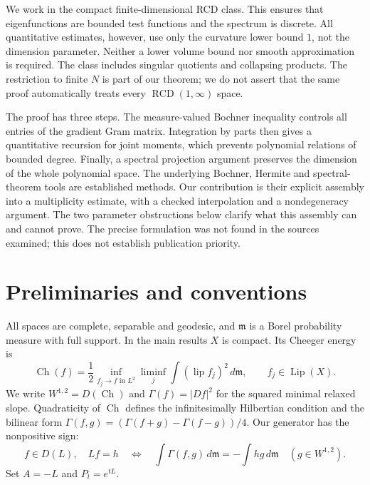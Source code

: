 \documentclass[12pt]{amsart}
\theoremstyle{definition}
\theoremstyle{remark}
\numberwithin{equation}{section}
\DeclareMathOperator{\Ch}{Ch}
\DeclareMathOperator{\Lip}{Lip}
\newcommand{\dm}{\,d\mathfrak m}
\theoremstyle{plain}
\begin{document}
We work in the compact finite-dimensional RCD class. This ensures
that eigenfunctions are bounded test functions and the spectrum is discrete.
All quantitative estimates, however, use only the curvature lower bound
$1$, not the dimension parameter. Neither a lower volume bound nor smooth
approximation is required. The class includes singular quotients and
collapsing products. The restriction to finite $N$ is part of our theorem;
we do not assert that the same proof automatically treats every
$\operatorname{RCD}(1,\infty)$ space.

The proof has three steps. The measure-valued Bochner inequality controls
all entries of the gradient Gram matrix. Integration by parts then gives
a quantitative recursion for joint moments, which prevents polynomial
relations of bounded degree. Finally, a spectral projection argument
preserves the dimension of the whole polynomial space. The underlying
Bochner, Hermite and spectral-theorem tools are established methods.
Our contribution is their explicit assembly into a multiplicity estimate,
with a checked interpolation and a nondegeneracy argument.
The two parameter obstructions below clarify what this assembly can and
cannot prove. The precise formulation was not found in the sources
examined; this does not establish publication priority.

\section{Preliminaries and conventions}
All spaces are complete, separable and geodesic, and $\mathfrak m$ is a
Borel probability measure with full support. In the main results $X$ is
compact. Its Cheeger energy is
\[
 \Ch(f)=\frac12\inf_{f_j\to f\text{ in }L^2}
 \liminf_j\int (\operatorname{lip} f_j)^2\dm,
 \qquad f_j\in\Lip(X).
\]
We write $W^{1,2}=D(\Ch)$ and $\Gamma(f)=|Df|^2$ for the squared minimal
relaxed slope. Quadraticity of $\Ch$ defines the infinitesimally Hilbertian
condition and the bilinear form
$\Gamma(f,g)=(\Gamma(f+g)-\Gamma(f-g))/4$.
Our generator has the nonpositive sign:
\begin{equation}\label{en:generator}
 f\in D(L),\quad Lf=h
 \quad\Longleftrightarrow\quad
 \int\Gamma(f,g)\dm=-\int hg\dm\quad(g\in W^{1,2}).
\end{equation}
Set $A=-L$ and $P_t=e^{tL}$.
\end{document}
